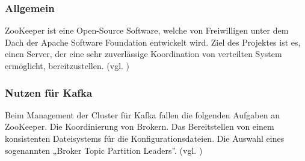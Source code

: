 \subsubsection{Allgemein}
ZooKeeper ist eine Open-Source Software, welche von Freiwilligen unter dem Dach der Apache Software Foundation entwickelt wird. Ziel des Projektes ist es, einen Server, der eine sehr zuverlässige Koordination von verteilten System ermöglicht, bereitzustellen. 
(vgl. \cite{Apache-ZooKeeper})
\subsubsection{Nutzen für Kafka}
Beim Management der Cluster für Kafka fallen die folgenden Aufgaben an ZooKeeper. Die Koordinierung von Brokern. Das Bereitstellen von einem konsistenten Dateisystems für die Konfigurationsdateien. Die Auswahl eines sogenannten „Broker Topic Partition Leaders”.
(vgl. \cite{Kafka-Architecture})

